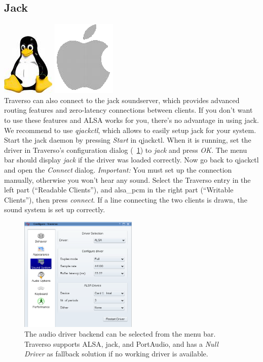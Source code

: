 \subsection{Jack}
\includegraphics[height=\baselineskip]{images/tux.png}
\includegraphics[height=\baselineskip]{images/mac.png}
\\
Traverso can also connect to the jack soundserver, which provides advanced routing features and zero-latency connections between clients. If you don't want to use these features and ALSA works for you, there's no advantage in using jack. We recommend to use \emph{qjackctl}, which allows to easily setup jack for your system. Start the jack daemon by pressing \emph{Start} in qjackctl. When it is running, set the driver in Traverso's configuration dialog (\FigB\ \ref{fig_driverconf}) to \emph{jack} and press \emph{OK}. The menu bar should display \emph{jack} if the driver was loaded correctly. Now go back to qjackctl and open the \emph{Connect} dialog. \emph{Important:} You must set up the connection manually, otherwise you won't hear any sound. Select the Traverso entry in the left part (``Readable Clients''), and alsa\_pcm in the right part (``Writable Clients''), then press \emph{connect}. If a line connecting the two clients is drawn, the sound system is set up correctly.

\begin{figure}
 \centering\includegraphics[width=0.5\textwidth]{images/sshot02.png}
 \caption{The audio driver backend can be selected from the menu bar. Traverso supports ALSA, jack, and PortAudio, and has a \emph{Null Driver} as fallback solution if no working driver is available.}
 \label{fig_driverconf}
\end{figure}


